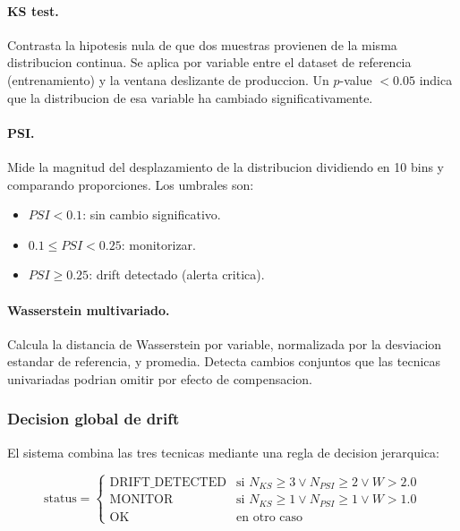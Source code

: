 \paragraph{KS test.} Contrasta la hipotesis nula de que dos muestras provienen de la misma distribucion continua. Se aplica por variable entre el dataset de referencia (entrenamiento) y la ventana deslizante de produccion. Un $p$-value $< 0.05$ indica que la distribucion de esa variable ha cambiado significativamente.

\paragraph{PSI.} Mide la magnitud del desplazamiento de la distribucion dividiendo en 10 bins y comparando proporciones. Los umbrales son:
\begin{itemize}
    \item $PSI < 0.1$: sin cambio significativo.
    \item $0.1 \leq PSI < 0.25$: monitorizar.
    \item $PSI \geq 0.25$: drift detectado (alerta critica).
\end{itemize}

\paragraph{Wasserstein multivariado.} Calcula la distancia de Wasserstein por variable, normalizada por la desviacion estandar de referencia, y promedia. Detecta cambios conjuntos que las tecnicas univariadas podrian omitir por efecto de compensacion.

\subsubsection{Decision global de drift}

El sistema combina las tres tecnicas mediante una regla de decision jerarquica:

\begin{equation}
    \text{status} = \begin{cases}
        \text{DRIFT\_DETECTED} & \text{si } N_{KS} \geq 3 \lor N_{PSI} \geq 2 \lor W > 2.0 \\
        \text{MONITOR} & \text{si } N_{KS} \geq 1 \lor N_{PSI} \geq 1 \lor W > 1.0 \\
        \text{OK} & \text{en otro caso}
    \end{cases}
\end{equation}

